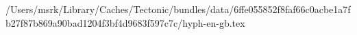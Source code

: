 /Users/msrk/Library/Caches/Tectonic/bundles/data/6ffe055852f8faf66c0acbe1a7fb27f87b869a90bad1204f3bf4d9683f597c7c/hyph-en-gb.tex